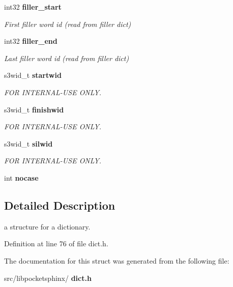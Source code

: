 \begin{DoxyCompactItemize}
\mbox{\label{structdict__t_abd48fdafaaa68a8df2fd82163c51a95c}} 
int32 \textbf{ filler\+\_\+start}
\begin{DoxyCompactList}\small\item\em First filler word id (read from filler dict) \end{DoxyCompactList}\item 
\mbox{\label{structdict__t_a77c6692e56308968804add1292275cb7}} 
int32 \textbf{ filler\+\_\+end}
\begin{DoxyCompactList}\small\item\em Last filler word id (read from filler dict) \end{DoxyCompactList}\item 
\mbox{\label{structdict__t_a22bc6c52ce9e04c4f3f7d0ba1972ee51}} 
s3wid\+\_\+t \textbf{ startwid}
\begin{DoxyCompactList}\small\item\em F\+OR I\+N\+T\+E\+R\+N\+A\+L-\/\+U\+SE O\+N\+LY. \end{DoxyCompactList}\item 
\mbox{\label{structdict__t_a3875be5336e2d9888f6d5cb83ded82c5}} 
s3wid\+\_\+t \textbf{ finishwid}
\begin{DoxyCompactList}\small\item\em F\+OR I\+N\+T\+E\+R\+N\+A\+L-\/\+U\+SE O\+N\+LY. \end{DoxyCompactList}\item 
\mbox{\label{structdict__t_aad07b22b94c360923f151c02890f6e68}} 
s3wid\+\_\+t \textbf{ silwid}
\begin{DoxyCompactList}\small\item\em F\+OR I\+N\+T\+E\+R\+N\+A\+L-\/\+U\+SE O\+N\+LY. \end{DoxyCompactList}\item 
\mbox{\label{structdict__t_a2240400afe39fbee593ff7e33f97008c}} 
int {\bfseries nocase}
\end{DoxyCompactItemize}


\subsection{Detailed Description}
a structure for a dictionary. 

Definition at line 76 of file dict.\+h.



The documentation for this struct was generated from the following file\+:\begin{DoxyCompactItemize}
\item 
src/libpocketsphinx/\textbf{ dict.\+h}\end{DoxyCompactItemize}
